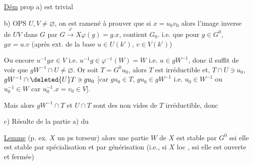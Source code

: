 


\uline{Dém} prop \qquad a) est trivial \qquad{}

b)  OPS $U,V\ne\varnothing$,  on est ramené à prouver que si  $x=u_0v_0$   alors l'image inverse de $UV$ dans $G$ par $G\xrightarrow{\varphi}X$\quad $\varphi(g)=g.x$,  contient $G_0$. i.e. que pour $g\in G^0$, \unsure{\ldots} $gx=u.v$ (après ext. de la base  $u\in U(k')$, $v\in V(k')$)

 Ou encore $u^{-1}gx\in V$ i.e. $u^{-1}g\in\varphi^{-1}(W)=W$ i.e.  $u\in gW^{-1}$, donc il suffit de voir que $gW^{-1}\cap U\ne\varnothing$. Or soit $T=G^0u_0$, alors  $T$ est irréductible et,  $T\cap U\ni u_0$, $gW^{-1}\cap\deleted{U}T\ni gu_0$ [car $gu_0\in T$, $gu_0\in gW^{-1}$ i.e. $u_0\in W^{-1}$ ou $u_0^{-1}\in W$ car $u_0^{-1}.x=v_0\in V$].

Mais alors $gW^{-1}\cap T$ et $U\cap T$ sont des  non vides de $T$ irréductible, donc  

c) Résulte de la partie a) du

\uline{Lemme}    (p. ex. $X$ un ps torseur) alors une partie $W$ de $X$ est stable par $G^0$ ssi elle est stable par spécialisation et par générisation (i.e., si $X$ loc , ssi elle est ouverte et fermée)

